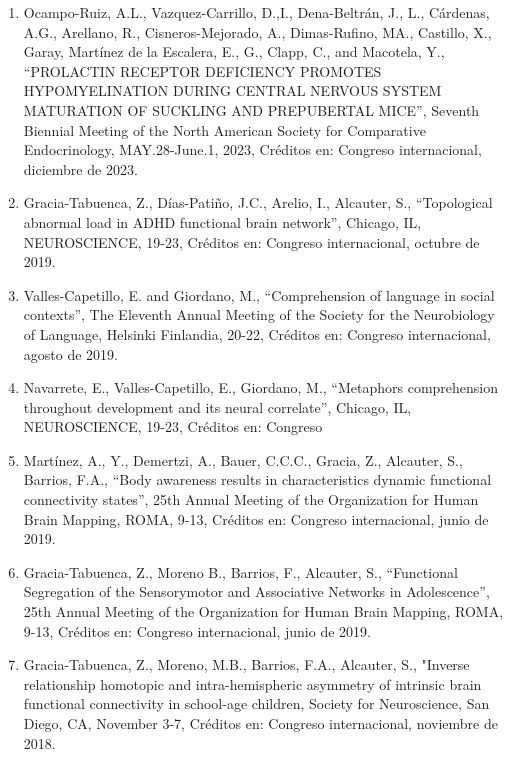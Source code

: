 \documentclass[12pt]{article}
\begin{document}
\begin{enumerate}
\item Ocampo-Ruiz, A.L., Vazquez-Carrillo, D.,I., Dena-Beltrán, J., L., Cárdenas, A.G., Arellano, R., Cisneros-Mejorado, A., 
Dimas-Rufino, 
MA., Castillo, X., Garay, Martínez de la Escalera, E., G., Clapp, C., and Macotela, Y., “PROLACTIN RECEPTOR DEFICIENCY PROMOTES 
HYPOMYELINATION DURING CENTRAL NERVOUS SYSTEM MATURATION OF SUCKLING AND PREPUBERTAL MICE”, Seventh Biennial Meeting of the North 
American Society for Comparative Endocrinology, MAY.28-June.1, 2023, Créditos en: Congreso internacional, diciembre de 2023.

\item Gracia-Tabuenca, Z., Días-Patiño, J.C., Arelio, I., Alcauter, S., “Topological abnormal load in ADHD functional brain network”, 
Chicago, IL, NEUROSCIENCE, 19-23, Créditos en: Congreso internacional, octubre de 2019.

\item Valles-Capetillo, E. and Giordano, M., “Comprehension of language in social contexts”, The Eleventh Annual Meeting of the Society 
for the Neurobiology of Language, Helsinki Finlandia, 20-22, Créditos en: Congreso internacional, agosto de 2019.

\item Navarrete, E., Valles-Capetillo, E., Giordano, M., “Metaphors comprehension throughout development and its neural correlate”, 
Chicago, IL, NEUROSCIENCE, 19-23, Créditos en: Congreso

\item Martínez, A., Y., Demertzi, A., Bauer, C.C.C., Gracia, Z., Alcauter, S., Barrios, F.A., “Body awareness results in 
characteristics 
dynamic functional connectivity states”, 25th Annual Meeting of the Organization for Human Brain Mapping, ROMA, 9-13, Créditos en: 
Congreso internacional, junio de 2019.

\item Gracia-Tabuenca, Z., Moreno B., Barrios, F., Alcauter, S., “Functional Segregation of the Sensorymotor and Associative Networks 
in 
Adolescence”, 25th Annual Meeting of the Organization for Human Brain Mapping, ROMA, 9-13, Créditos en: Congreso internacional, junio 
de 2019.

\item Gracia-Tabuenca, Z., Moreno, M.B., Barrios, F.A., Alcauter, S., "Inverse relationship homotopic and intra-hemispheric asymmetry 
of 
intrinsic brain functional connectivity in school-age children, Society for Neuroscience, San Diego, CA, November 3-7, Créditos en: 
Congreso internacional, noviembre de 2018.


\end{enumerate}
\end{document}
